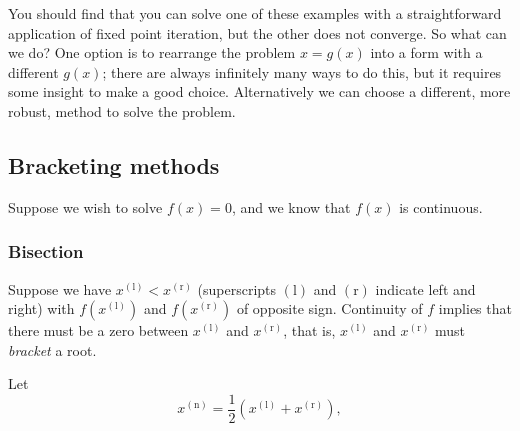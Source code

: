 
\vspace{3mm}


You should find that you can solve one of these examples with a straightforward
application of fixed point iteration, but the other does not converge.
So what can we do? One option is to rearrange the problem $x = g(x)$ into a
form with a different $g(x)$; there are always infinitely many ways to do
this, but it requires some insight to make a good choice. Alternatively we
can choose a different, more robust, method to solve the problem.


\subsection{Bracketing methods}

Suppose we wish to solve $ f(x) = 0 $, and we know that $f(x)$ is continuous.


\subsubsection{Bisection}

Suppose we have $ x^{(\mathrm{l})} < x^{(\mathrm{r})} $ (superscripts $(\mathrm{l})$
and $(\mathrm{r})$ indicate left and right)
with $ f(x^{(\mathrm{l})}) $ and
$ f(x^{(\mathrm{r})}) $ of opposite sign. Continuity of $f$ implies that
there must be a zero between $x^{(\mathrm{l})}$ and $x^{(\mathrm{r})}$,
that is, $x^{(\mathrm{l})}$ and $x^{(\mathrm{r})}$ must \textit{bracket} a root.

Let
\begin{displaymath}
x^{(\mathrm{n})} = \frac{1}{2}\left( x^{(\mathrm{l})} + x^{(\mathrm{r})} \right),
\end{displaymath}







  

